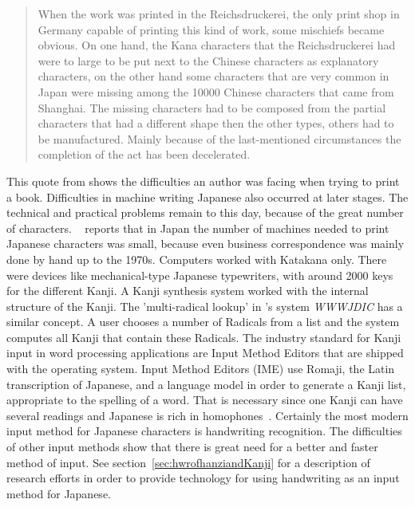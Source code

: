\begin{quote}
When the work was printed in the Reichsdruckerei, the only print shop
in Germany capable of printing this kind of work, some mischiefs became obvious.
On one hand, the Kana characters that the Reichsdruckerei had were to large to
be put next to the Chinese characters as explanatory characters, on the other
hand some characters that are very common in Japan were missing among 
the 10000 Chinese characters that came from Shanghai.
The missing characters had to be composed from the partial characters that
had a different shape then the other types, others had to be manufactured.
Mainly because of the last-mentioned circumstances the completion of the
act has been decelerated.
\end{quote}
This quote from  shows the difficulties an author
was facing when trying to print a book. 
Difficulties in machine writing Japanese also occurred at later stages. The 
technical and practical problems remain to this day, because of the great number
of characters. ~\citeyear{Foljanty1984} reports that 
in Japan the number of 
machines needed to print Japanese characters was small, because even business
correspondence was mainly done by hand up to the 1970s. Computers worked with
Katakana only. There were devices like mechanical-type Japanese typewriters,
with around 2000 keys for the different Kanji. A Kanji synthesis system worked
with the internal structure of the Kanji. The 'multi-radical lookup' in 
's \citeyear{Breen2004} system \emph{WWWJDIC} has
a similar concept. A user chooses a number of Radicals from a list and the 
system computes all Kanji that contain these Radicals.
The industry standard for Kanji input in word processing applications are 
Input Method Editors that are shipped with the operating system. 
Input Method Editors (IME) use Romaji, the Latin transcription of Japanese, and 
a language model in order to generate a Kanji list, 
appropriate to the spelling of a word. 
That is necessary since one Kanji can have several readings and Japanese
is rich in homophones~. 
Certainly the most modern input method for Japanese characters is handwriting
recognition. The difficulties of other input methods show that there is 
great need for a better and faster method of input. See 
section~\ref{sec:hwrofhanziandKanji} for a description of research 
efforts in order to provide technology for using handwriting as an input method 
for Japanese.

